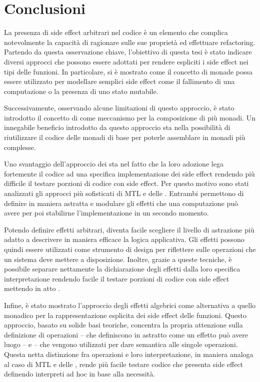 \chapter{Conclusioni}

La presenza di side effect arbitrari nel codice è un elemento che complica notevolmente la capacità di ragionare sulle sue proprietà ed effettuare refactoring.
Partendo da questa osservazione chiave, l'obiettivo di questa tesi è stato indicare diversi approcci che possono essere adottati per rendere espliciti i side effect nei tipi delle funzioni.
In particolare, si è mostrato come il concetto di monade possa essere utilizzato per modellare semplici side effect come il fallimento di una computazione o la presenza di uno stato mutabile.

Successivamente, osservando alcune limitazioni di questo approccio, è stato introdotto il concetto di  come meccanismo per la composizione di più monadi.
Un innegabile beneficio introdotto da questo approccio sta nella possibilità di riutilizzare il codice delle monadi di base per poterle assemblare in monadi più complesse.

Uno svantaggio dell'approccio dei  sta nel fatto che la loro adozione lega fortemente il codice ad una specifica implementazione dei side effect rendendo più difficile il testare porzioni di codice con side effect.
Per questo motivo sono stati analizzati gli approcci più sofisticati di MTL e delle .
Entrambi permettono di definire in maniera astratta e modulare gli effetti che una computazione può avere per poi stabilirne l'implementazione in un secondo momento.

Potendo definire effetti arbitrari, diventa facile scegliere il livello di astrazione più adatto a descrivere in maniera efficace la logica applicativa.
Gli effetti possono quindi essere utilizzati come strumento di design per riflettere sulle operazioni che un sistema deve mettere a disposizione.
Inoltre, grazie a queste tecniche, è possibile separare nettamente la dichiarazione degli effetti dalla loro specifica interpretazione rendendo facile il testare porzioni di codice con side effect mettendo in atto .

Infine, è stato mostrato l'approccio degli effetti algebrici come alternativa a quello monadico per la rappresentazione esplicita dei side effect delle funzioni.
Questo approccio, basato su solide basi teoriche, concentra la propria attenzione sulla definizione di operazioni -- che definiscono in astratto come un effetto può avere luogo -- e  -- che vengono utilizzati per dare semantica alle singole operazioni.
Questa netta distinzione fra operazioni e loro interpretazione, in maniera analoga al caso di MTL e delle , rende più facile testare codice che presenta side effect definendo interpreti ad hoc in base alla necessità.

